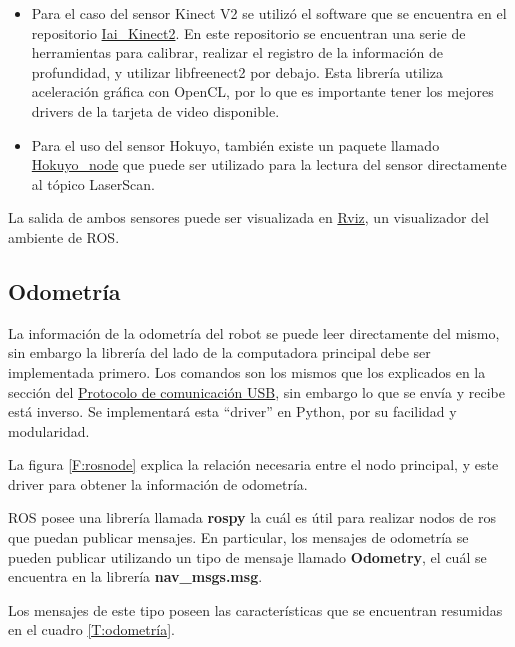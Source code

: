 \begin{itemize}
\item Para el caso del sensor Kinect V2 se utilizó el software que se encuentra en el repositorio \href{https://github.com/code-iai/iai_kinect2}{Iai\_Kinect2}. En este repositorio se encuentran una serie de herramientas para calibrar, realizar el registro de la información de profundidad, y utilizar libfreenect2 por debajo. Esta librería utiliza aceleración gráfica con OpenCL, por lo que es importante tener los mejores drivers de la tarjeta de video disponible.

\item Para el uso del sensor Hokuyo, también existe un paquete llamado \href{https://github.com/ros-drivers/hokuyo_node}{Hokuyo\_node} que puede ser utilizado para la lectura del sensor directamente al tópico LaserScan.
\end{itemize}

La salida de ambos sensores puede ser visualizada en \href{http://wiki.ros.org/rviz}{Rviz}, un visualizador del ambiente de ROS.

\subsection{Odometría}

\label{seccionodometria}

La información de la odometría del robot se puede leer directamente del mismo, sin embargo la librería del lado de la computadora principal debe ser implementada primero. Los comandos son los mismos que los explicados en la sección del \hyperref[libreria]{Protocolo de comunicación USB}, sin embargo lo que se envía y recibe está inverso. Se implementará esta ``driver'' en Python, por su facilidad y modularidad.

La figura \ref{F:rosnode} explica la relación necesaria entre el nodo principal, y este driver para obtener la información de odometría.

ROS posee una librería llamada \textbf{rospy} la cuál es útil para realizar nodos de ros que puedan publicar mensajes. En particular, los mensajes de odometría se pueden publicar utilizando un tipo de mensaje llamado \textbf{Odometry}, el cuál se encuentra en la librería \textbf{nav\_msgs.msg}.

Los mensajes de este tipo poseen las características que se encuentran resumidas en el cuadro \ref{T:odometría}.

